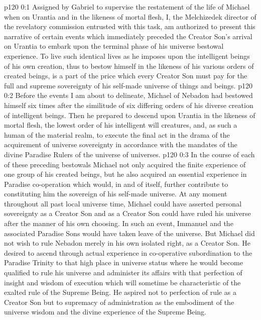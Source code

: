 \author{Mantutia Melchizedek}
\vs p120 0:1 Assigned by Gabriel to supervise the restatement of the life of Michael when on Urantia and in the likeness of mortal flesh, I, the Melchizedek director of the revelatory commission entrusted with this task, am authorized to present this narrative of certain events which immediately preceded the Creator Son’s arrival on Urantia to embark upon the terminal phase of his universe bestowal experience. To live such identical lives as he imposes upon the intelligent beings of his own creation, thus to bestow himself in the likeness of his various orders of created beings, is a part of the price which every Creator Son must pay for the full and supreme sovereignty of his self\hyp{}made universe of things and beings.
\vs p120 0:2 Before the events I am about to delineate, Michael of Nebadon had bestowed himself six times after the similitude of six differing orders of his diverse creation of intelligent beings. Then he prepared to descend upon Urantia in the likeness of mortal flesh, the lowest order of his intelligent will creatures, and, as such a human of the material realm, to execute the final act in the drama of the acquirement of universe sovereignty in accordance with the mandates of the divine Paradise Rulers of the universe of universes.
\vs p120 0:3 In the course of each of these preceding bestowals Michael not only acquired the finite experience of one group of his created beings, but he also acquired an essential experience in Paradise co\hyp{}operation which would, in and of itself, further contribute to constituting him the sovereign of his self\hyp{}made universe. At any moment throughout all past local universe time, Michael could have asserted personal sovereignty as a Creator Son and as a Creator Son could have ruled his universe after the manner of his own choosing. In such an event, Immanuel and the associated Paradise Sons would have taken leave of the universe. But Michael did not wish to rule Nebadon merely in his own isolated right, as a Creator Son. He desired to ascend through actual experience in co\hyp{}operative subordination to the Paradise Trinity to that high place in universe status where he would become qualified to rule his universe and administer its affairs with that perfection of insight and wisdom of execution which will sometime be characteristic of the exalted rule of the Supreme Being. He aspired not to perfection of rule as a Creator Son but to supremacy of administration as the embodiment of the universe wisdom and the divine experience of the Supreme Being.
